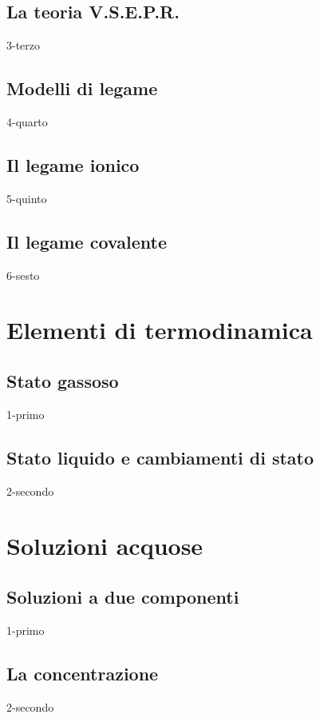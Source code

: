 \documentclass[openany,12pt]{book}%
\begin{document}
\newpage

\section{La teoria V.S.E.P.R.}
{3-terzo}

\newpage

\section{Modelli di legame}
{4-quarto}

\newpage

\section{Il legame ionico}
{5-quinto}

\newpage

\section{Il legame covalente}
{6-sesto}

\chapter{Elementi di termodinamica}

\section{Stato gassoso}
{1-primo}

\section{Stato liquido e cambiamenti di stato}
{2-secondo}

\chapter{Soluzioni acquose}

\section{Soluzioni a due componenti}
{1-primo}

\section{La concentrazione}
{2-secondo}
\end{document}

